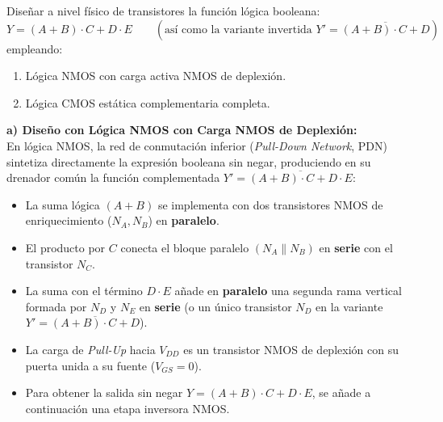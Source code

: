 \begin{ejercicio}
Diseñar a nivel físico de transistores la función lógica booleana:
\begin{equation}
    Y = (A + B) \cdot C + D \cdot E \qquad \left(\text{así como la variante invertida } Y' = \overline{(A + B) \cdot C + D}\right)
\end{equation}
empleando:
\begin{enumerate}[label=\alph*)]
    \item Lógica NMOS con carga activa NMOS de deplexión.
    \item Lógica CMOS estática complementaria completa.
\end{enumerate}
\tcbline
\textbf{a) Diseño con Lógica NMOS con Carga NMOS de Deplexión:}\\[4pt]
En lógica NMOS, la red de conmutación inferior (\textit{Pull-Down Network}, PDN) sintetiza directamente la expresión booleana sin negar, produciendo en su drenador común la función complementada $Y' = \overline{(A+B)\cdot C + D\cdot E}$:
\begin{itemize}[leftmargin=*]
    \item La suma lógica $(A + B)$ se implementa con dos transistores NMOS de enriquecimiento ($N_A, N_B$) en \textbf{paralelo}.
    \item El producto por $C$ conecta el bloque paralelo $(N_A \parallel N_B)$ en \textbf{serie} con el transistor $N_C$.
    \item La suma con el término $D \cdot E$ añade en \textbf{paralelo} una segunda rama vertical formada por $N_D$ y $N_E$ en \textbf{serie} (o un único transistor $N_D$ en la variante $Y' = \overline{(A+B)\cdot C + D}$).
    \item La carga de \textit{Pull-Up} hacia $V_{DD}$ es un transistor NMOS de deplexión con su puerta unida a su fuente ($V_{GS} = 0$).
    \item Para obtener la salida sin negar $Y = (A+B)\cdot C + D\cdot E$, se añade a continuación una etapa inversora NMOS.
\end{itemize}

\begin{center}
\end{center}
\end{ejercicio}
